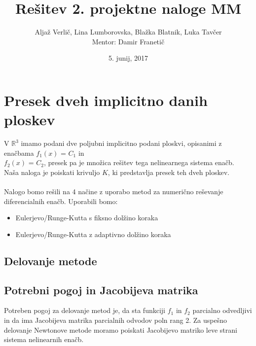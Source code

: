 \documentclass[]{article}
\title{Rešitev 2. projektne naloge MM}
\author{Aljaž Verlič, Lina Lumborovska, Blažka Blatnik, Luka Tavčer \\
	Mentor: Damir Franetič}
\date{5. junij, 2017}
\begin{document}
\maketitle
\renewcommand{\abstractname}{Uvod}


\section{Presek dveh implicitno danih ploskev}
	V $\mathbb{R}^3$ imamo podani dve poljubni implicitno podani ploskvi, opisanimi z enačbama $f_{1}(x)$ = $C_{1}$ in\\ $f_{2}(x)$ = $C_{2}$, presek pa je množica rešitev tega nelinearnega sistema enačb.\\
	Naša naloga je poiskati krivuljo $K$, ki predstavlja presek teh dveh ploskev. \\ \\
	Nalogo bomo rešili na 4 načine z uporabo metod za numerično reševanje diferencialnih enačb. Uporabili bomo:
	\begin{itemize}  
		\item Eulerjevo/Runge-Kutta s fiksno dolžino koraka
		\item Eulerjevo/Runge-Kutta z adaptivno dolžino koraka
	\end{itemize}

\subsection{Delovanje metode}
	

\subsection{Potrebni pogoj in Jacobijeva matrika}
	Potreben pogoj za delovanje metod je, da sta funkciji $f_{1}$ in $f_{2}$ parcialno odvedljivi in da ima Jacobijeva matrika parcialnih odvodov poln rang 2. Za uspešno delovanje Newtonove metode moramo poiskati Jacobijevo matriko leve strani sistema nelinearnih enačb.
\end{document}
